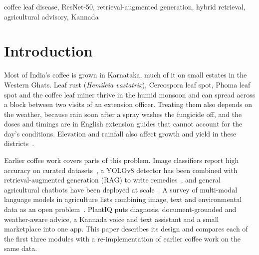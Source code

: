\begin{IEEEkeywords}
coffee leaf disease, ResNet-50, retrieval-augmented generation, hybrid retrieval, agricultural advisory, Kannada
\end{IEEEkeywords}

\section{Introduction}
Most of India's coffee is grown in Karnataka, much of it on small estates in the Western Ghats. Leaf rust
(\textit{Hemileia vastatrix}), Cercospora leaf spot, Phoma leaf spot and the coffee leaf miner thrive in the humid
monsoon and can spread across a block between two visits of an extension officer. Treating them also depends on the
weather, because rain soon after a spray washes the fungicide off, and the doses and timings are in English extension
guides that cannot account for the day's conditions. Elevation and rainfall also affect growth and yield in these
districts~\cite{patil2022elevation}.

Earlier coffee work covers parts of this problem. Image classifiers report high accuracy on curated
datasets~\cite{anudeep2024cnn}, a YOLOv8 detector has been combined with retrieval-augmented generation (RAG) to write
remedies~\cite{selvakumar2024rag}, and general agricultural chatbots have been deployed at
scale~\cite{singh2024farmerchat}. A survey of multi-modal language models in agriculture lists combining image, text
and environmental data as an open problem~\cite{sapkota2024mmllm}. PlantIQ puts diagnosis, document-grounded and
weather-aware advice, a Kannada voice and text assistant and a small marketplace into one app. This paper describes
its design and compares each of the first three modules with a re-implementation of earlier coffee work on the same data.

